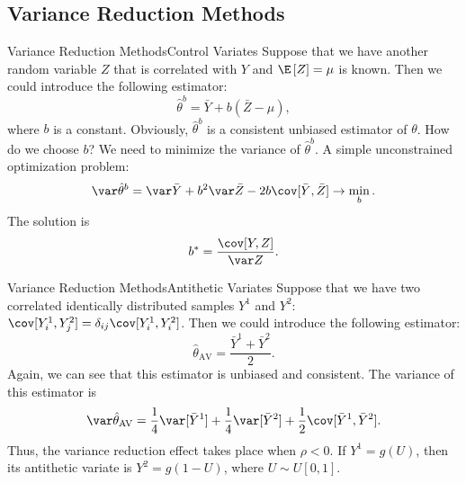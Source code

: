 \subsection{Variance Reduction Methods}

    \begin{frame}{Variance Reduction Methods}{Control Variates}
        Suppose that we have another random variable $Z$ that is correlated with $Y$ and 
        $\E\left[Z\right] = \mu$ is known. Then we could introduce the following estimator:
        \begin{equation}
            \hat\theta^b = \bar Y + b(\bar Z - \mu),
        \end{equation}
        where $b$ is a constant. Obviously, $\hat\theta^b$ is a consistent unbiased estimator of 
        $\theta$. How do we choose $b$? We need to minimize the variance of $\hat\theta^b$. A simple 
        unconstrained optimization problem:
        \begin{equation*}
            \var \hat\theta^b = \var \bar Y + b^2 \var \bar Z - 2b \cov [\bar Y, \bar Z] \to \min_b.
        \end{equation*}
        The solution is
        \begin{equation}
            b^* = \frac{\cov [Y, Z]}{\var Z}.\label{eq:control_variates:bopt}
        \end{equation}
    \end{frame}

    \begin{frame}{Variance Reduction Methods}{Antithetic Variates}
        Suppose that we have two correlated identically distributed samples $Y^1$ and $Y^2$: $\cov[Y_i^1, Y_j^2] = \delta_{ij}\cov[Y_i^1, Y_i^2]$.
        Then we could introduce the following estimator:
        \begin{equation}
            \hat\theta_{\operatorname{AV}} = \frac{\bar Y^1 + \bar Y^2}{2}.
        \end{equation}
        Again, we can see that this estimator is unbiased and consistent. The variance of this estimator is
        \begin{equation*}
            \var \hat\theta_{\operatorname{AV}} = \frac{1}{4} \var[\bar Y^1] + \frac{1}{4} \var[\bar Y^2] + \frac{1}{2} \cov[\bar Y^1, \bar Y^2] .
        \end{equation*}
        Thus, the variance reduction effect takes place when $\rho < 0$. If $Y^1 = g(U)$, then its antithetic 
        variate is $Y^2 = g(1-U)$, where $U \sim U[0, 1]$. 
    \end{frame}